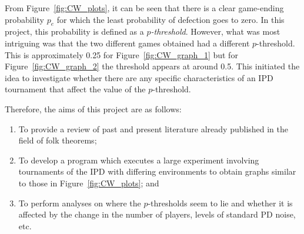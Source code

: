 From Figure~\ref{fig:CW_plots}, it can be seen that there is a clear game-ending
probability \(p_{e}\) for which the least probability of defection goes to zero.
In this project, this probability is defined as a \textit{\(p\)-threshold}.
However, what was most intriguing was that the two different games obtained had
a different \(p\)-threshold. This is approximately 0.25
for Figure~\ref{fig:CW_graph_1} but for Figure~\ref{fig:CW_graph_2} the threshold
appears at around 0.5. This initiated the idea to investigate whether there are
any specific characteristics of an IPD tournament that affect the value of the
\(p\)-threshold.

Therefore, the aims of this project are as follows:
\begin{enumerate}
\item To provide a review of past and present literature already published in
the field of folk theorems;

\item To develop a program which executes a large experiment involving
tournaments of the IPD with differing environments to obtain
graphs similar to those in Figure~\ref{fig:CW_plots}; and

\item To perform analyses on where the \(p\)-thresholds seem to lie and
whether it is affected by the change in the number of players, levels of
standard PD noise, etc.
\end{enumerate}
